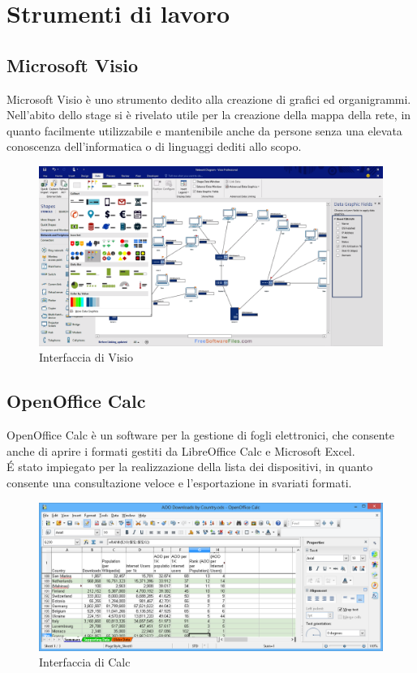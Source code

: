 \documentclass[Tesi.tex]{subfiles}
\begin{document}
\newpage
\section{Strumenti di lavoro}

\subsection{Microsoft Visio}
Microsoft Visio è uno strumento dedito alla creazione di grafici ed organigrammi. \\
Nell'abito dello stage si è rivelato utile per la creazione della mappa della rete, in quanto facilmente utilizzabile e mantenibile anche da persone senza una elevata conoscenza dell'informatica o di linguaggi dediti allo scopo.
\begin{figure}[H]
	\centering
	\includegraphics[width=0.73\linewidth]{"images/Visio_esempio"}
	\caption{Interfaccia di Visio}
	\label{fig:Interfaccia di Visio}
\end{figure}

\subsection{OpenOffice Calc}
OpenOffice Calc è un software per la gestione di fogli elettronici, che consente anche di aprire i formati gestiti da LibreOffice Calc e Microsoft Excel. \\
\'E stato impiegato per la realizzazione della lista dei dispositivi, in quanto consente una consultazione veloce e l'esportazione in svariati formati.
\begin{figure}[H]
	\centering
	\includegraphics[width=0.77\linewidth]{"images/screen_calc"}
	\caption{Interfaccia di Calc}
	\label{fig:Interfaccia di Calc}
\end{figure}
\end{document}
